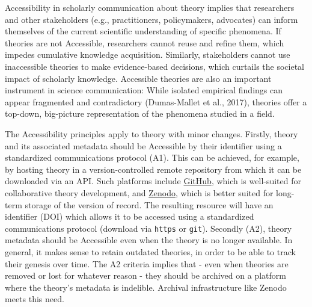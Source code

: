 \documentclass[man]{apa7}
\begin{document}
Accessibility in scholarly communication about theory implies that researchers and other stakeholders (e.g., practitioners, policymakers, advocates) can inform themselves of the current scientific understanding of specific phenomena.
If theories are not Accessible, researchers cannot reuse and refine them, which impedes cumulative knowledge acquisition.
Similarly, stakeholders cannot use inaccessible theories to make evidence-based decisions,
which curtails the societal impact of scholarly knowledge.
Accessible theories are also an important instrument in science communication:
While isolated empirical findings can appear fragmented and contradictory (Dumas-Mallet et al., 2017),
theories offer a top-down, big-picture representation of the phenomena studied in a field.

The Accessibility principles
apply to theory with minor changes.
Firstly, theory and its associated metadata should be Accessible by their identifier using a standardized communications protocol (A1).
This can be achieved, for example, by hosting theory in a version-controlled remote repository from which it can be downloaded via an API.
Such platforms include \href{https://github.com}{GitHub}, which is well-suited for collaborative theory development, and \href{https://zenodo.org}{Zenodo}, which is better suited for long-term storage of the version of record.
The resulting resource will have an identifier (DOI) which allows it to be accessed using a standardized communications protocol (download via \texttt{https} or \texttt{git}).
Secondly (A2), theory metadata should be Accessible even when the theory is no longer available.
In general, it makes sense to retain outdated theories,
in order to be able to track their genesis over time.
The A2 criteria implies that - even when theories are removed or lost for whatever reason - they should be archived on a platform where the theory's metadata is indelible.
Archival infrastructure like Zenodo meets this need.
\end{document}
